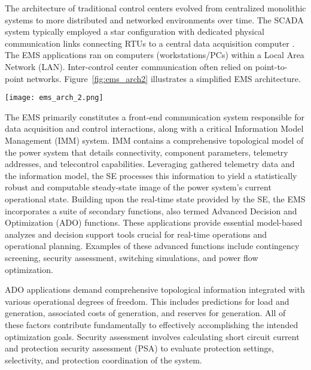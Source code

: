 
The architecture of traditional control centers evolved from centralized monolithic systems to more distributed and networked environments over time. The SCADA system typically employed a star configuration with dedicated physical communication links connecting RTUs to a central data acquisition computer \autocite{1405870}. The EMS applications ran on computers (workstations/PCs) within a Local Area Network (LAN). Inter-control center communication often relied on point-to-point networks. Figure~\cref{fig:ems_arch2} illustrates a simplified EMS architecture.

\begin{figure*}[htbp]
    \centering
    \texttt{[image: ems\_arch\_2.png]}
    \caption{Simplified EMS architecture.}
    \label{fig:ems_arch2}
\end{figure*}

The EMS primarily constitutes a front-end communication system responsible for data acquisition and control interactions, along with a critical Information Model Management (IMM) system. IMM contains a comprehensive topological model of the power system that details connectivity, component parameters, telemetry addresses, and telecontrol capabilities. Leveraging gathered telemetry data and the information model, the SE processes this information to yield a statistically robust and computable steady-state image of the power system's current operational state. Building upon the real-time state provided by the SE, the EMS incorporates a suite of secondary functions, also termed Advanced Decision and Optimization (ADO) functions. These applications provide essential model-based analyzes and decision support tools crucial for real-time operations and operational planning. Examples of these advanced functions include contingency screening, security assessment, switching simulations, and power flow optimization. 


ADO applications demand comprehensive topological information integrated with various operational degrees of freedom.  This includes predictions for load and generation, associated costs of generation, and reserves for generation. All of these factors contribute fundamentally to effectively accomplishing the intended optimization goals. Security assessment involves calculating short circuit current and protection security assessment (PSA) to evaluate protection settings, selectivity, and protection coordination of the system.

